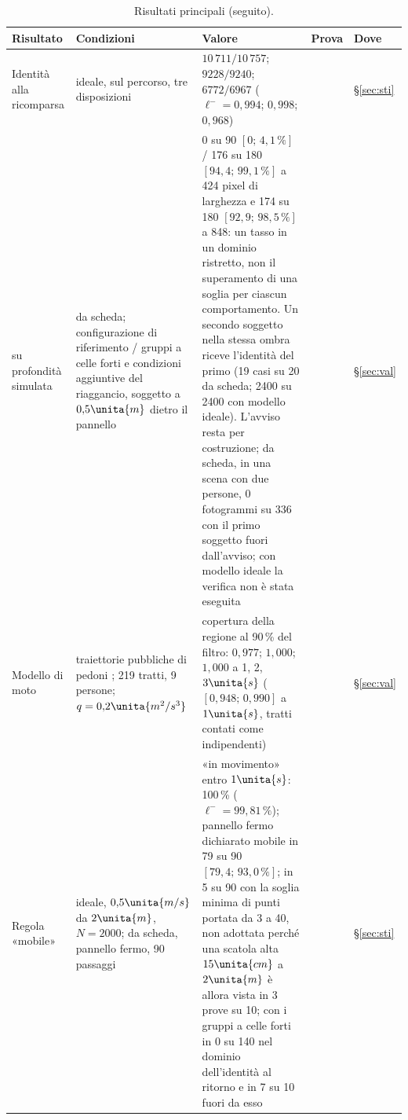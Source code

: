 \begin{table}[p]
\begin{tabularx}{\textwidth}{@{}>{\RaggedRight\arraybackslash}p{2.8cm}>{\RaggedRight\arraybackslash}p{4.1cm}L>{\RaggedRight\arraybackslash}p{1.2cm}>{\RaggedRight\arraybackslash}p{1.05cm}@{}}
\bottomrule
\end{tabularx}
\end{table}

\begin{table}[p]
\centering\footnotesize
\setlength{\tabcolsep}{4pt}
\caption{Risultati principali (seguito).}\label{tab:intro-sintesi-due}
\begin{tabularx}{\textwidth}{@{}>{\RaggedRight\arraybackslash}p{2.8cm}>{\RaggedRight\arraybackslash}p{4.1cm}L>{\RaggedRight\arraybackslash}p{1.2cm}>{\RaggedRight\arraybackslash}p{1.05cm}@{}}
\toprule
Risultato & Condizioni & Valore & Prova & Dove\\
\midrule
Identità alla ricomparsa & ideale, sul percorso, tre disposizioni & $10\,711/10\,757$; $9228/9240$; $6772/6967$ ($\ell^-=0{,}994$; $0{,}998$; $0{,}968$) &  & \S\ref{sec:sti}\\
\quad su profondità simulata & da scheda; configurazione di riferimento / gruppi a celle forti e condizioni aggiuntive del riaggancio, soggetto a $0{,}5\unita{m}$ dietro il pannello & 0 su 90 $[0;\,4{,}1\,\%]$ / 176 su 180 $[94{,}4;\,99{,}1\,\%]$ a 424 pixel di larghezza e 174 su 180 $[92{,}9;\,98{,}5\,\%]$ a 848: un tasso in un dominio ristretto, non il superamento di una soglia per ciascun comportamento. Un secondo soggetto nella stessa ombra riceve l'identità del primo (19 casi su 20 da scheda; 2400 su 2400 con modello ideale). L'avviso resta per costruzione; da scheda, in una scena con due persone, 0 fotogrammi su 336 con il primo soggetto fuori dall'avviso; con modello ideale la verifica non è stata eseguita &  & \S\ref{sec:val}\\
Modello di moto & traiettorie pubbliche di pedoni \cite{thor}; 219 tratti, 9 persone; $q=0{,}2\unita{m^2/s^3}$ & copertura della regione al 90\,\% del filtro: $0{,}977$; $1{,}000$; $1{,}000$ a 1, 2, $3\unita{s}$ ($[0{,}948;\,0{,}990]$ a $1\unita{s}$, tratti contati come indipendenti) &  & \S\ref{sec:val}\\
Regola «mobile» & ideale, $0{,}5\unita{m/s}$ da $2\unita{m}$, $N=2000$; da scheda, pannello fermo, 90 passaggi & «in movimento» entro $1\unita{s}$: 100\,\% ($\ell^-=99{,}81\,\%$); pannello fermo dichiarato mobile in 79 su 90 $[79{,}4;\,93{,}0\,\%]$; in 5 su 90 con la soglia minima di punti portata da 3 a 40, non adottata perché una scatola alta $15\unita{cm}$ a $2\unita{m}$ è allora vista in 3 prove su 10; con i gruppi a celle forti in 0 su 140 nel dominio dell'identità al ritorno e in 7 su 10 fuori da esso &  & \S\ref{sec:sti}\\

\end{tabularx}
\end{table}
